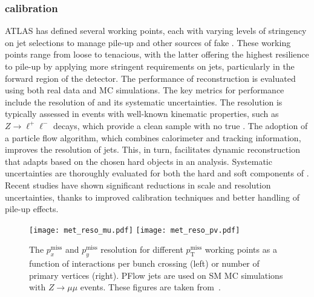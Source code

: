         \subsubsection{\MET calibration}
            ATLAS has defined several \MET working points, each with varying levels of stringency on jet selections to manage pile-up and other sources of fake 
            \MET. These working points range from loose to tenacious, with the latter offering the highest resilience to pile-up by applying more stringent 
            requirements on jets, particularly in the forward region of the detector.
            The performance of \MET reconstruction is evaluated using both real data and MC simulations. The key metrics for performance include 
            the resolution of \MET and its systematic uncertainties. The resolution is typically assessed in events with well-known kinematic properties, such 
            as \(Z \rightarrow \ell^+\ell^-\) decays, which provide a clean sample with no true \MET.
            The adoption of a particle flow algorithm, which combines calorimeter and tracking information, improves the resolution of jets. 
            This, in turn, facilitates dynamic \MET reconstruction that adapts based on the chosen hard objects in an analysis.
            Systematic uncertainties are thoroughly evaluated for both the hard and soft components of \MET. Recent studies have shown significant 
            reductions in scale and resolution uncertainties, thanks to improved calibration techniques and better handling of pile-up effects.
            \begin{figure}[htbp]
                \centering
                \texttt{[image: met\_reso\_mu.pdf]}
                \texttt{[image: met\_reso\_pv.pdf]}
                \caption{
                    The $p_x^\text{miss}$ and $p_y^\text{miss}$ resolution for different $p_\text{T}^\text{miss}$ working points as a function of interactions per bunch crossing (left) or number of primary vertices (right). 
                    PFlow jets are used on SM MC simulations with $Z\rightarrow\mu\mu$ events. 
                    These figures are taken from~\cite{JETM-2020-03}.
                }
                \label{fig:met_reso}
            \end{figure}

            
    

